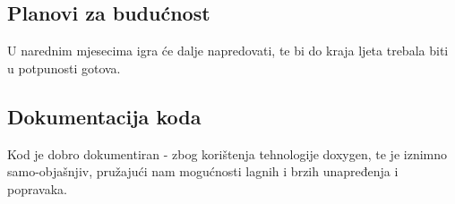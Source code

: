 \documentclass[12pt]{article}
\begin{document}
	\subsection{Planovi za budućnost}
	U narednim mjesecima igra će dalje napredovati, te bi do kraja ljeta trebala biti u potpunosti gotova.
	
	\subsection{Dokumentacija koda}
	Kod je dobro dokumentiran - zbog korištenja tehnologije doxygen, te je iznimno samo-objašnjiv, pružajući nam mogućnosti lagnih i brzih unapređenja i popravaka.
	\clearpage		
	
	\newpage	
	\begin{appendix}
		\listoffigures
	\end{appendix}
	
\end{document}
